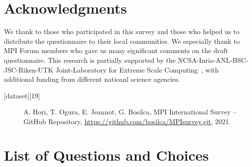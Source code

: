 \documentclass[preprint,5p,times]{elsarticle}
\begin{document}
\section*{Acknowledgments}

We thank to those who participated in this survey and those who helped us to
distribute the questionnaire to their local communities. We especially thank to
MPI Forum members who gave us many significant comments on the draft
questionnaire. This research is partially supported by the
NCSA-Inria-ANL-BSC-JSC-Riken-UTK Joint-Laboratory for Extreme Scale
Computing~\cite{JLESC}, with additional funding from different natioanl science
agencies.



{\footnotesize
  \begin{description}
  \item[{[dataset][19]}] A. Hori, T. Ogura, E. Jeannot,
G. Bosilca, MPI International Survey – GitHub Repository,
\url{https://github.com/bosilca/MPIsurvey.git}, 2021.
  \end{description}
}

\appendix
\section{List of Questions and Choices}
\label{app:questions}
\end{document}
